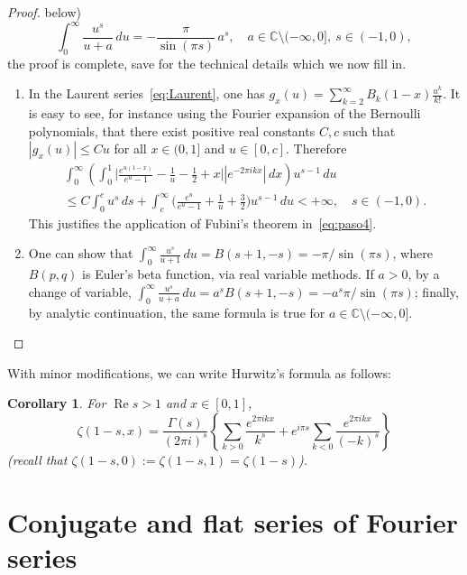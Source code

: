 \documentclass[11pt,a4paper,reqno]{amsart}
\newcommand{\C}{\mathbb{C}}
\renewcommand{\Re}{\operatorname{Re}}
\theoremstyle{plain}
\newtheorem{cor}[theorem]{Corollary}
\theoremstyle{remark}
\numberwithin{equation}{section}
\begin{document}
\begin{proof}
below)
\begin{equation*}
  \int_0^\infty \frac{u^s}{u+a}\,du = -\frac{\pi}{\sin(\pi s)}\,a^{s},
  \quad a\in\C\setminus (-\infty,0], \ s\in (-1,0),
\end{equation*}
the proof is complete, save for the technical details which we now fill in.
\begin{enumerate}
  \item\label{item:fubini}
In the Laurent series~\eqref{eq:Laurent}, one has $g_x(u) = \sum_{k=2}^\infty B_k(1-x)\frac{u^k}{k!}$. It is easy to see, for instance using the Fourier expansion of the Bernoulli polynomials, that there exist positive real constants $C,c$ such that $|g_x(u)|\leq C u$ for all $x\in (0,1]$ and $u\in [0,c]$. Therefore
\begin{multline*}
  \int_0^\infty \left(\int_0^1 \biggl| \frac{e^{u(1-x)}}{e^u-1}
  - \frac{1}{u}-\frac{1}{2}+x \biggr| |e^{-2\pi ikx}|\,dx \right) u^{s-1} \,du
  \\
  \leq C\int_0^c u^s\,ds + \int_c^\infty \biggl(\frac{e^{u}}{e^u-1}
  +\frac{1}{u}+\frac32\biggr) u^{s-1} \, du
  < +\infty,
  \quad s\in (-1,0).
\end{multline*}
This justifies the application of Fubini's theorem in~\eqref{eq:paso4}.
  \item\label{item:integral} One can show that
$\int_0^\infty \frac{u^s}{u+1}\,du = B(s+1,-s) = -\pi/\sin(\pi s)$, 
where $B(p,q)$ is Euler's beta function, via real variable methods. If $a>0$, by a change of variable, $\int_0^\infty \frac{u^s}{u+a}\,du = a^s B(s+1,-s) = -a^s\pi/\sin(\pi s)$; finally, by analytic continuation, the same formula is true for $a\in\C\setminus (-\infty,0]$.
\end{enumerate}
\end{proof}


With minor modifications, we can write Hurwitz's formula as follows:

\begin{cor}
\label{cor:Hurwitzformula}
For $\Re s>1$ and $x\in [0,1]$,
\begin{equation*}
  \zeta(1-s,x) = \frac{\Gamma(s)}{(2\pi i)^s} \left\{ \sum_{k>0} \frac{e^{2\pi ikx}}{k^s}
  + e^{i\pi s} \sum_{k<0} \frac{e^{2\pi ikx}}{(-k)^s} \right\}
\end{equation*}
(recall that $\zeta(1-s,0):=\zeta(1-s,1)=\zeta(1-s)$).
\end{cor}

\section{Conjugate and flat series of Fourier series}
\label{sec:conjugate}
\end{document}
